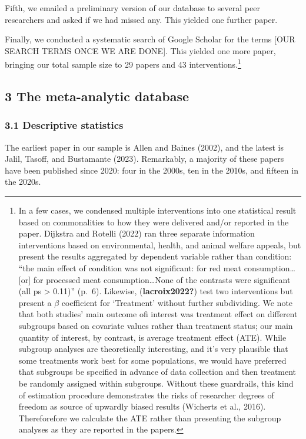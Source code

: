 \documentclass[
  man]{apa6}
\begin{document}
Fifth, we emailed a preliminary version of our database to several peer researchers and asked if we had missed any. This yielded one further paper.

Finally, we conducted a systematic search of Google Scholar for the terms {[}OUR SEARCH TERMS ONCE WE ARE DONE{]}. This yielded one more paper, bringing our total sample size to 29 papers and 43 interventions.\footnote{In a few cases, we condensed multiple interventions into one statistical result based on commonalities to how they were delivered and/or reported in the paper. Dijkstra and Rotelli (2022) ran three separate information interventions based on environmental, health, and animal welfare appeals, but present the results aggregated by dependent variable rather than condition: ``the main effect of condition was not significant: for red meat consumption\ldots{[}or{]} for processed meat consumption\ldots None of the contrasts were significant (all ps \textgreater{} 0.11)'' (p.~6). Likewise, (\textbf{lacroix2022?}) test two interventions but present a \(\beta\) coefficient for `Treatment' without further subdividing. We note that both studies' main outcome ofi interest was treatment effect on different subgroups based on covariate values rather than treatment status; our main quantity of interest, by contrast, is average treatment effect (ATE). While subgroup analyses are theoretically interesting, and it's very plausible that some treatments work best for some populations, we would have preferred that subgroups be specified in advance of data collection and then treatment be randomly assigned within subgroups. Without these guardrails, this kind of estimation procedure demonstrates the risks of researcher degrees of freedom as source of upwardly biased results (Wicherts et al., 2016). Thereforefore we calculate the ATE rather than presenting the subgroup analyses as they are reported in the papers.}

\subsection{3 The meta-analytic database}\label{the-meta-analytic-database}

\subsubsection{3.1 Descriptive statistics}\label{descriptive-statistics}

The earliest paper in our sample is Allen and Baines (2002), and the latest is Jalil, Tasoff, and Bustamante (2023). Remarkably, a majority of these papers have been published since 2020: four in the 2000s, ten in the 2010s, and fifteen in the 2020s.
\end{document}
